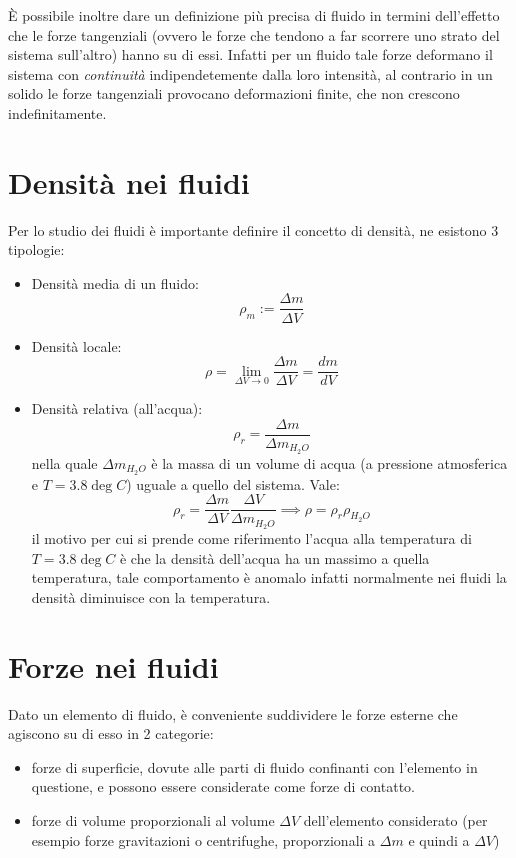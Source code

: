 \documentclass[11pt, a4paper, openright]{book}
\theoremstyle{plain}
\theoremstyle{definition}
\begin{document}
È possibile inoltre dare un definizione più precisa di fluido in termini dell'effetto che le forze tangenziali (ovvero le forze che tendono a far scorrere uno strato del sistema sull'altro) hanno su di essi.
Infatti per un fluido tale forze deformano il sistema con \textit{continuità} indipendetemente dalla loro intensità, al contrario in un solido le forze tangenziali provocano deformazioni finite, che non crescono indefinitamente.

\section{Densità nei fluidi}
Per lo studio dei fluidi è importante definire il concetto di densità, ne esistono 3 tipologie:
\begin{itemize}
    \item Densità media di un fluido:
    \begin{equation}
        \rho_m := \frac{\Delta m}{\Delta V}
    \end{equation}
    \item Densità locale:
    \begin{equation}
        \rho = \lim_{\Delta V \to 0} \frac{\Delta m}{\Delta V} = \frac{dm}{dV}
    \end{equation}
    \item Densità relativa (all'acqua):
    \begin{equation}
        \rho_r = \frac{\Delta m}{\Delta m_{H_2O}}
    \end{equation}
    nella quale $\Delta m_{H_2O}$ è la massa di un volume di acqua (a pressione atmosferica e $T = 3.8\deg C$) uguale a quello del sistema.
    Vale:
    \begin{equation}
        \rho_r = \frac{\Delta m}{\Delta V}\frac{\Delta V}{\Delta m_{H_2O}} \implies \rho = \rho_r\rho_{H_2O}
    \end{equation}
    il motivo per cui si prende come riferimento l'acqua alla temperatura di $T = 3.8\deg C$ è che la densità dell'acqua ha un massimo a quella temperatura, tale comportamento è anomalo infatti normalmente nei fluidi la densità diminuisce con la temperatura.
\end{itemize}

\section{Forze nei fluidi}
Dato un elemento di fluido, è conveniente suddividere le forze esterne che agiscono su di esso in 2 categorie:
\begin{itemize}
    \item forze di superficie, dovute alle parti di fluido confinanti con l'elemento in questione, e possono essere considerate come forze di contatto.
    \item forze di volume proporzionali al volume $\Delta V$ dell'elemento considerato (per esempio forze gravitazioni o centrifughe, proporzionali a $\Delta m$ e quindi a $\Delta V$)
\end{itemize}
\end{document}
